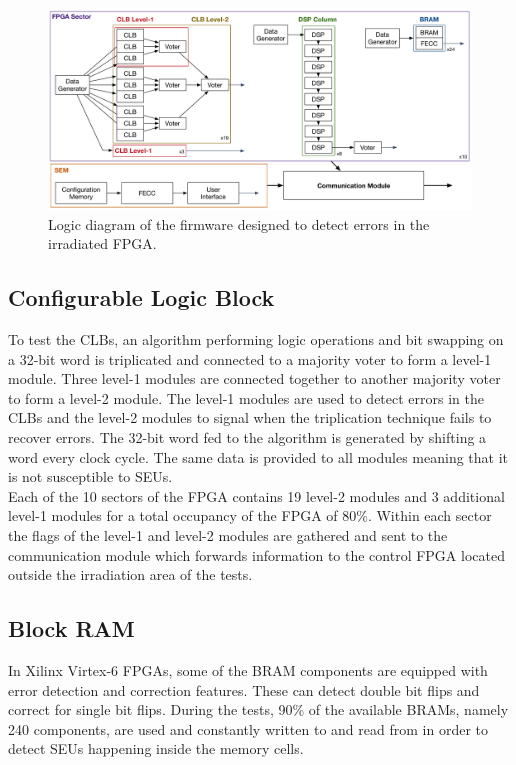     \begin{figure}[t!]
      \centering
      \includegraphics[width=\textwidth]{img/II-5-irradiation/firmware}
      \caption{Logic diagram of the firmware designed to detect errors in the irradiated FPGA.}
      \label{fig:II-5-firmware}
    \end{figure}

    \subsection{Configurable Logic Block}

      To test the CLBs, an algorithm performing logic operations and bit swapping on a 32-bit word is triplicated and connected to a majority voter to form a level-1 module. Three level-1 modules are connected together to another majority voter to form a level-2 module. The level-1 modules are used to detect errors in the CLBs and the level-2 modules to signal when the triplication technique fails to recover errors. The 32-bit word fed to the algorithm is generated by shifting a word every clock cycle. The same data is provided to all modules meaning that it is not susceptible to SEUs. \\

      Each of the 10 sectors of the FPGA contains 19 level-2 modules and 3 additional level-1 modules for a total occupancy of the FPGA of 80\%. Within each sector the flags of the level-1 and level-2 modules are gathered and sent to the communication module which forwards information to the control FPGA located outside the irradiation area of the tests.

    \subsection{Block RAM}

      In Xilinx Virtex-6 FPGAs, some of the BRAM components are equipped with error detection and correction features. These can detect double bit flips and correct for single bit flips. During the tests, 90\% of the available BRAMs, namely 240 components, are used and constantly written to and read from in order to detect SEUs happening inside the memory cells.

